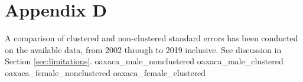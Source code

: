 \documentclass[class=article, crop=false]{standalone}
\begin{document}
\section{Appendix D}
\label{sec:appendixD}
A comparison of clustered and non-clustered standard errors has been conducted on the available data, from 2002 through to 2019 inclusive. See discussion in Section \ref{sec:limitations}.
{oaxaca_male_nonclustered}
{oaxaca_male_clustered}
{oaxaca_female_nonclustered}
{oaxaca_female_clustered}
\doublespacing

\ifstandalone

\fi
\end{document}
